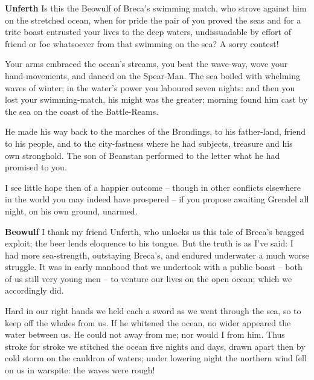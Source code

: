 \documentclass[a4paper]{article}
\begin{document}
{\textbf{Unferth} Is this the Beowulf of Breca's swimming match, 
who strove against him on the stretched ocean,
when for pride the pair of you proved the seas
and for a trite boast entrusted your lives
to the deep waters, undissuadable
by effort of friend or foe whatsoever
from that swimming on the sea? A sorry contest!

Your arms embraced the ocean’s streams,
you beat the wave-way, wove your hand-movements,
and danced on the Spear-Man. The sea boiled with whelming
waves of winter; in the water’s power
you laboured seven nights: and then you lost your swimming-match,
his might was the greater; morning found him
cast by the sea on the coast of the Battle-Reams.

He made his way back to the marches of the Brondings,
to his father-land, friend to his people,
and to the city-fastness where he had subjects, treasure
and his own stronghold. The son of Beanstan
performed to the letter what he had promised to you.

I see little hope then of a happier outcome
– though in other conflicts elsewhere in the world
you may indeed have prospered – if you propose awaiting
Grendel all night, on his own ground, unarmed.

\textbf{Beowulf} I thank my friend Unferth, who unlocks us this tale
of Breca's bragged exploit; 
the beer lends eloquence to his tongue.
But the truth is as I’ve said:
I had more sea-strength, outstaying Breca’s,
and endured underwater a much worse struggle.
    It was in early manhood that we undertook
with a public boast – both of us still
very young men – to venture our lives
on the open ocean; which we accordingly did.

Hard in our right hands we held each a sword
as we went through the sea, so to keep off
the whales from us. If he whitened the ocean,
no wider appeared the water between us.
He could not away from me; nor would I from him.
Thus stroke for stroke we stitched the ocean
five nights and days, drawn apart then
by cold storm on the cauldron of waters;
under lowering night the northern wind
fell on us in warspite: the waves were rough!

}
\end{document}
